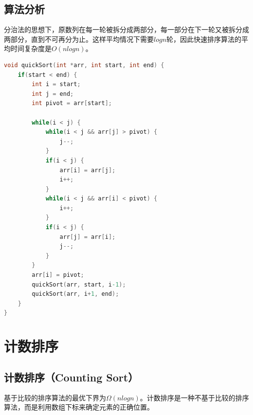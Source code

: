 \subsection{算法分析}

分治法的思想下，原数列在每一轮被拆分成两部分，每一部分在下一轮又被拆分成两部分，直到不可再分为止。这样平均情况下需要$ logn $轮，因此快速排序算法的平均时间复杂度是$ O(nlogn) $。

\begin{table}[H]
    \centering
    \caption{快速排序算法分析}
\end{table}


\begin{lstlisting}[language=C]
void quickSort(int *arr, int start, int end) {
    if(start < end) {
        int i = start;
        int j = end;
        int pivot = arr[start];

        while(i < j) {
            while(i < j && arr[j] > pivot) {
                j--;
            }
            if(i < j) {
                arr[i] = arr[j];
                i++;
            }
            while(i < j && arr[i] < pivot) {
                i++;
            }
            if(i < j) {
                arr[j] = arr[i];
                j--;
            }
        }
        arr[i] = pivot;
        quickSort(arr, start, i-1);
        quickSort(arr, i+1, end);
    } 
}
\end{lstlisting}

\newpage

\section{计数排序}

\subsection{计数排序（Counting Sort）}

基于比较的排序算法的最优下界为$ \Omega(nlogn) $。计数排序是一种不基于比较的排序算法，而是利用数组下标来确定元素的正确位置。 \\

